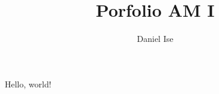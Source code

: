 \documentclass[12pt]{article}
\title{Porfolio AM I}
\author{Daniel Ise}
\begin{document}

Hello, world!
\end{document}
